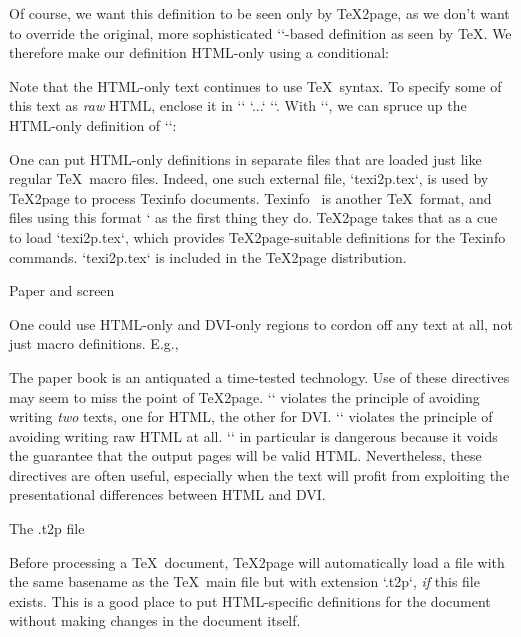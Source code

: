 \begintt
\def\bull{{\bf *}}
\endtt
Of course, we want this definition to be seen only
by \TeX2page, as we don’t want to override the
original, more sophisticated `\vrule`-based definition as seen
by \TeX.
We therefore make our
definition HTML-only
using a conditional:

\begintt
\ifx\shipout\UnDeFiNeD %
  \def\bull{{\bf *}}
\fi
\endtt

Note that the HTML-only text continues to use \TeX\ syntax.
To specify some of this text as {\em raw} HTML, enclose it
in `\rawhtml` `...` `\endrawhtml`.   With
`\rawhtml`, we can
spruce up the
HTML-only definition of `\bull`:

\begintt
\ifx\shipout\UnDeFiNeD %
  \def\bull{{\bf
  \rawhtml<span style="color: #990000">&spades;</span>\endrawhtml
  }}
\fi
\endtt

One can put HTML-only definitions in separate files
that are loaded just like regular \TeX\ macro files.
Indeed, one such external file, `texi2p.tex`, is used
by \TeX2page to process Texinfo
documents.  Texinfo~\cite{texinfo} is another \TeX\
format, and files using this format `
as the first thing they do.  \TeX2page takes that as a
cue to
load `texi2p.tex`, which provides \TeX2page-suitable
definitions for the Texinfo commands.  `texi2p.tex`
is included in the \TeX2page distribution.

\beginsection Paper and screen

One could use HTML-only and DVI-only regions to cordon off
any text at all, not just macro definitions.  E.g.,

\begintt
The paper book is
\ifx\shipout\UnDeFiNeD %
an antiquated
\else %
a time-tested
\fi
technology.
\endtt
Use of these directives may seem to miss the point of
\TeX2page.  `\ifx\shipout\UnDeFiNeD` violates the
principle of avoiding  writing {\em two} texts, one
for HTML, the other for DVI.  `\rawhtml` violates the
principle of avoiding writing raw HTML at all.
`\rawhtml` in particular is dangerous because it voids
the guarantee that the output pages will be valid HTML.
Nevertheless, these directives are often useful, especially when the
text will profit from exploiting the presentational differences between
HTML and DVI.

\beginsection The {.t2p} file

%
Before processing a \TeX\ document, \TeX2page will
automatically load a file
with the same basename as the \TeX\ main file but with
extension `.t2p`, {\em if} this file exists.  This
is a good place to put HTML-specific definitions for
the document without making  changes in the document
itself.

